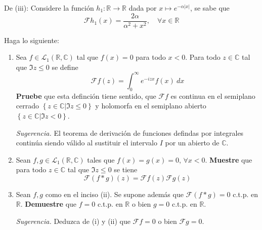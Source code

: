 \documentclass[12pt]{report}
\newcounter{it}
\theoremstyle{largebreak}
\renewcommand{\leq}{\ensuremath{\leqslant}}
\newcommand\abs[1]{\ensuremath{\left|#1\right|}}
\newcommand\cf[3]{\ensuremath{#1:#2\rightarrow#3}}
\newcommand{\fou}[1]{\ensuremath{\mathcal{F}#1}}
\begin{document}
\begin{sol}
        De (iii): Considere la función $\cf{h_1}{\mathbb{R}}{\mathbb{R}}$ dada por $x\mapsto e^{-\alpha\abs{x}}$, se sabe que
        \begin{equation*}
            \fou{h_1}(x)=\frac{2\alpha}{\alpha^2+x^2},\quad\forall x\in\mathbb{R}
        \end{equation*}
    \end{sol}

    \begin{excer}
        Haga lo siguiente:
        \begin{enumerate}
            \item Sea $f\in\mathcal{L}_1(\mathbb{R},\mathbb{C})$ tal que $f(x)=0$ para todo $x<0$. Para todo $z\in\mathbb{C}$ tal que $\Im z\leq 0$ se define
            \begin{equation*}
                \fou{f}(z)=\int_0^{\infty}e^{ -izx}f(x)\:dx
            \end{equation*}
            \textbf{Pruebe} que esta definción tiene sentido, que $\fou{f}$ es continua en el semiplano cerrado $\left\{z\in\mathbb{C}\Big|\Im z\leq0 \right\}$ y holomorfa en el semiplano abierto $\left\{z\in\mathbb{C}\Big|\Im z<0 \right\}$.

            \textit{Sugerencia.} El teorema de derivación de funciones defindas por integrales continúa siendo válido al sustituir el intervalo $I$ por un abierto de $\mathbb{C}$.

            \item Sean $f,g\in\mathcal{L}_1(\mathbb{R},\mathbb{C})$ tales que $f(x)=g(x)=0$, $\forall x<0$. \textbf{Muestre} que para todo $z\in\mathbb{C}$ tal que $\Im z\leq 0$ se tiene
            \begin{equation*}
                \fou{(f*g)}(z)=\fou{f}(z)\fou{g}(z)
            \end{equation*}
            \item Sean $f,g$ como en el inciso (ii). Se supone además que $\fou{(f*g)}=0$ c.t.p. en $\mathbb{R}$. \textbf{Demuestre} que $f=0$ c.t.p. en $\mathbb{R}$ o bien $g=0$ c.t.p. en $\mathbb{R}$.
            
            \textit{Sugerencia.} Deduzca de (i) y (ii) que $\fou{f}=0$ o bien $\fou{g}=0$.
        \end{enumerate}
    \end{excer}
\end{document}
